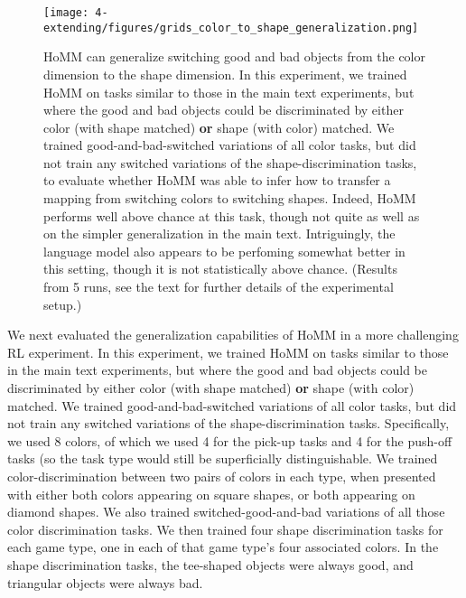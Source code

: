 \begin{figure}[h]
\centering
\texttt{[image: 4-extending/figures/grids\_color\_to\_shape\_generalization.png]}
\caption[HoMM can generalize switching good and bad objects from the color dimension to the shape dimension.]{HoMM can generalize switching good and bad objects from the color dimension to the shape dimension. In this experiment, we trained HoMM on tasks similar to those in the main text experiments, but where the good and bad objects could be discriminated by either color (with shape matched) \textbf{or} shape (with color) matched. We trained good-and-bad-switched variations of all color tasks, but did not train any switched variations of the shape-discrimination tasks, to evaluate whether HoMM was able to infer how to transfer a mapping from switching colors to switching shapes. Indeed, HoMM performs well above chance at this task, though not quite as well as on the simpler generalization in the main text. Intriguingly, the language model also appears to be perfoming somewhat better in this setting, though it is not statistically above chance. (Results from 5 runs, see the text for further details of the experimental setup.)} \label{fig:extending:RL:color_to_shape_generalization}
\end{figure}

We next evaluated the generalization capabilities of HoMM in a more challenging RL experiment. In this experiment, we trained HoMM on tasks similar to those in the main text experiments, but where the good and bad objects could be discriminated by either color (with shape matched) \textbf{or} shape (with color) matched. We trained good-and-bad-switched variations of all color tasks, but did not train any switched variations of the shape-discrimination tasks. Specifically, we used 8 colors, of which we used 4 for the pick-up tasks and 4 for the push-off tasks (so the task type would still be superficially distinguishable. We trained color-discrimination between two pairs of colors in each type, when presented with either both colors appearing on square shapes, or both appearing on diamond shapes. We also trained switched-good-and-bad variations of all those color discrimination tasks. We then trained four shape discrimination tasks for each game type, one in each of that game type's four associated colors. In the shape discrimination tasks, the tee-shaped objects were always good, and triangular objects were always bad.

